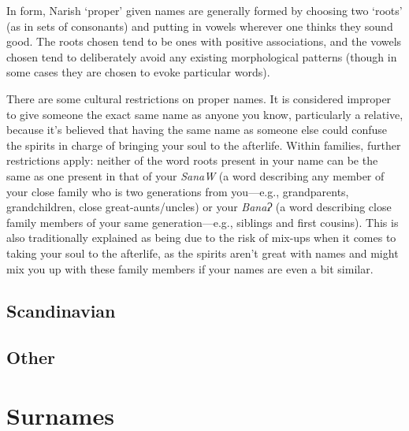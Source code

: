 \documentclass[a4paper,11pt,twoside,openright]{memoir}
\newcommand{\bigglot}{Ɂ}
\begin{document}
In form, Narish `proper' given names are generally formed by choosing two `roots' (as in sets of consonants) and putting in vowels wherever one thinks they sound good. The roots chosen tend to be ones with positive associations, and the vowels chosen tend to deliberately avoid any existing morphological patterns (though in some cases they are chosen to evoke particular words).

There are some cultural restrictions on proper names. It is considered improper to give someone the exact same name as anyone you know, particularly a relative, because it's believed that having the same name as someone else could confuse the spirits in charge of bringing your soul to the afterlife. Within families, further restrictions apply: neither of the word roots present in your name can be the same as one present in that of your \textit{SanaW} (a word describing any member of your close family who is two generations from you---e.g., grandparents, grandchildren, close great-aunts/uncles) or your \textit{Bana\bigglot} (a word describing close family members of your same generation---e.g., siblings and first cousins). This is also traditionally explained as being due to the risk of mix-ups when it comes to taking your soul to the afterlife, as the spirits aren't great with names and might mix you up with these family members if your names are even a bit similar.

\subsection{Scandinavian}

\subsection{Other}

\section{Surnames}
\end{document}
